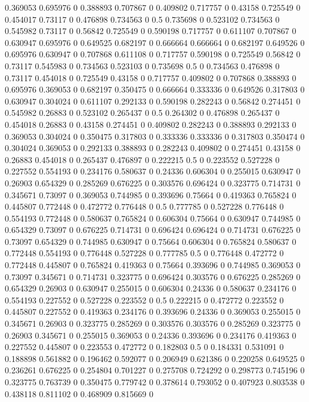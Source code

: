 0.369053 0.695976 0
0.388893 0.707867 0
0.409802 0.717757 0
0.43158 0.725549 0
0.454017 0.73117 0
0.476898 0.734563 0
0.5 0.735698 0
0.523102 0.734563 0
0.545982 0.73117 0
0.56842 0.725549 0
0.590198 0.717757 0
0.611107 0.707867 0
0.630947 0.695976 0
0.649525 0.682197 0
0.666664 0.666664 0
0.682197 0.649526 0
0.695976 0.630947 0
0.707868 0.611108 0
0.717757 0.590198 0
0.725549 0.56842 0
0.73117 0.545983 0
0.734563 0.523103 0
0.735698 0.5 0
0.734563 0.476898 0
0.73117 0.454018 0
0.725549 0.43158 0
0.717757 0.409802 0
0.707868 0.388893 0
0.695976 0.369053 0
0.682197 0.350475 0
0.666664 0.333336 0
0.649526 0.317803 0
0.630947 0.304024 0
0.611107 0.292133 0
0.590198 0.282243 0
0.56842 0.274451 0
0.545982 0.26883 0
0.523102 0.265437 0
0.5 0.264302 0
0.476898 0.265437 0
0.454018 0.26883 0
0.43158 0.274451 0
0.409802 0.282243 0
0.388893 0.292133 0
0.369053 0.304024 0
0.350475 0.317803 0
0.333336 0.333336 0
0.317803 0.350474 0
0.304024 0.369053 0
0.292133 0.388893 0
0.282243 0.409802 0
0.274451 0.43158 0
0.26883 0.454018 0
0.265437 0.476897 0
0.222215 0.5 0
0.223552 0.527228 0
0.227552 0.554193 0
0.234176 0.580637 0
0.24336 0.606304 0
0.255015 0.630947 0
0.26903 0.654329 0
0.285269 0.676225 0
0.303576 0.696424 0
0.323775 0.714731 0
0.345671 0.73097 0
0.369053 0.744985 0
0.393696 0.75664 0
0.419363 0.765824 0
0.445807 0.772448 0
0.472772 0.776448 0
0.5 0.777785 0
0.527228 0.776448 0
0.554193 0.772448 0
0.580637 0.765824 0
0.606304 0.75664 0
0.630947 0.744985 0
0.654329 0.73097 0
0.676225 0.714731 0
0.696424 0.696424 0
0.714731 0.676225 0
0.73097 0.654329 0
0.744985 0.630947 0
0.75664 0.606304 0
0.765824 0.580637 0
0.772448 0.554193 0
0.776448 0.527228 0
0.777785 0.5 0
0.776448 0.472772 0
0.772448 0.445807 0
0.765824 0.419363 0
0.75664 0.393696 0
0.744985 0.369053 0
0.73097 0.345671 0
0.714731 0.323775 0
0.696424 0.303576 0
0.676225 0.285269 0
0.654329 0.26903 0
0.630947 0.255015 0
0.606304 0.24336 0
0.580637 0.234176 0
0.554193 0.227552 0
0.527228 0.223552 0
0.5 0.222215 0
0.472772 0.223552 0
0.445807 0.227552 0
0.419363 0.234176 0
0.393696 0.24336 0
0.369053 0.255015 0
0.345671 0.26903 0
0.323775 0.285269 0
0.303576 0.303576 0
0.285269 0.323775 0
0.26903 0.345671 0
0.255015 0.369053 0
0.24336 0.393696 0
0.234176 0.419363 0
0.227552 0.445807 0
0.223553 0.472772 0
0.182803 0.5 0
0.184331 0.531091 0
0.188898 0.561882 0
0.196462 0.592077 0
0.206949 0.621386 0
0.220258 0.649525 0
0.236261 0.676225 0
0.254804 0.701227 0
0.275708 0.724292 0
0.298773 0.745196 0
0.323775 0.763739 0
0.350475 0.779742 0
0.378614 0.793052 0
0.407923 0.803538 0
0.438118 0.811102 0
0.468909 0.815669 0
